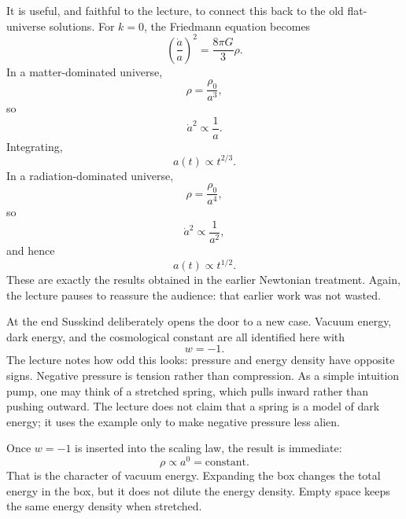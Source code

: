 It is useful, and faithful to the lecture, to connect this back to the old flat-universe solutions. For \(k=0\), the Friedmann equation becomes
\begin{equation}
\left(\frac{\dot a}{a}\right)^{2}=\frac{8\pi G}{3}\rho .
\end{equation}
In a matter-dominated universe,
\begin{equation}
\rho=\frac{\rho_{0}}{a^{3}},
\end{equation}
so
\begin{equation}
\dot a^{2}\propto \frac{1}{a}.
\end{equation}
Integrating,
\begin{equation}
a(t)\propto t^{2/3}.
\end{equation}
In a radiation-dominated universe,
\begin{equation}
\rho=\frac{\rho_{0}}{a^{4}},
\end{equation}
so
\begin{equation}
\dot a^{2}\propto \frac{1}{a^{2}},
\end{equation}
and hence
\begin{equation}
a(t)\propto t^{1/2}.
\end{equation}
These are exactly the results obtained in the earlier Newtonian treatment. Again, the lecture pauses to reassure the audience: that earlier work was not wasted.

At the end Susskind deliberately opens the door to a new case. Vacuum energy, dark energy, and the cosmological constant are all identified here with
\begin{equation}
w=-1 .
\end{equation}
The lecture notes how odd this looks: pressure and energy density have opposite signs. Negative pressure is tension rather than compression. As a simple intuition pump, one may think of a stretched spring, which pulls inward rather than pushing outward. The lecture does not claim that a spring is a model of dark energy; it uses the example only to make negative pressure less alien.

Once \(w=-1\) is inserted into the scaling law, the result is immediate:
\begin{equation}
\rho\propto a^{0}=\text{constant}.
\end{equation}
That is the character of vacuum energy. Expanding the box changes the total energy in the box, but it does not dilute the energy density. Empty space keeps the same energy density when stretched.

